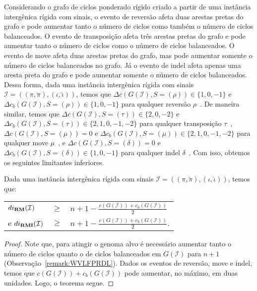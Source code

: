 Considerando o grafo de ciclos ponderado rígido criado a partir de uma instância intergênica rígida com sinais, o evento de reversão afeta duas arestas pretas do grafo e pode aumentar tanto o número de ciclos como também o número de ciclos balanceados. O evento de transposição afeta três arestas pretas do grafo e pode aumentar tanto o número de ciclos como o número de ciclos balanceados. O evento de move afeta duas arestas pretas do grafo, mas pode aumentar somente o número de ciclos balanceados no grafo. Já o evento de indel afeta apenas uma aresta preta do grafo e pode aumentar somente o número de ciclos balanceados. Dessa forma, dada uma instância intergênica rígida com sinais $\mathcal{I} = ((\pi,\breve\pi),(\iota,\breve\iota))$, temos que $\Delta c(G(\mathcal{I}), S=(\rho)) \in \{1,0,-1\}$ e $\Delta c_b(G(\mathcal{I}), S=(\rho)) \in \{1,0,-1\}$ para qualquer reversão $\rho$~\cite{1996-bafna-pevzner,2021b-oliveira-etal}. De maneira similar, temos que $\Delta c(G(\mathcal{I}), S=(\tau)) \in \{2,0,-2\}$ e $\Delta c_b(G(\mathcal{I}), S=(\tau)) \in \{2,1,0,{-1},{-2}\}$ para qualquer transposição $\tau$~\cite{1998-bafna-pevzner,2021a-oliveira-etal}, $\Delta c(G(\mathcal{I}), S=(\mu)) = 0$ e $\Delta c_b(G(\mathcal{I}), S=(\mu)) \in \{2,1,0,{-1},{-2}\}$ para qualquer move $\mu$~\cite{2021a-oliveira-etal}, e $\Delta c(G(\mathcal{I}), S=(\delta)) = 0$ e $\Delta c_b(G(\mathcal{I}), S=(\delta)) \in \{1,0,{-1}\}$ para qualquer indel $\delta$~\cite{2021b-oliveira-etal}. Com isso, obtemos os seguintes limitantes inferiores.

\begin{theorem}\label{theorem:OCNPWYNL}
Dada uma instância intergênica rígida com sinais $\mathcal{I} = ((\pi,\breve\pi),(\iota,\breve\iota))$, temos que:

\begin{tabular}{lll}
  $di_{\textbf{RM}}(\mathcal{I})$     & $ \ge $ & ${n + 1} - \frac{c(G(\mathcal{I})) + c_b(G(\mathcal{I}))}{2}$ \\
  e $di_{\textbf{RMI}}(\mathcal{I})$    & $ \ge $ & ${n + 1} - \frac{c(G(\mathcal{I})) + c_b(G(\mathcal{I}))}{2}$. \\
\end{tabular}
\end{theorem}
\begin{proof}
Note que, para atingir o genoma alvo é necessário aumentar tanto o número de ciclos quanto o de ciclos balanceados em $G(\mathcal{I})$ para $n+1$ (Observação~\ref{remark:WVLFPRDL}). Dados os eventos de reversão, move e indel, temos que $c(G(\mathcal{I})) + c_b(G(\mathcal{I}))$ pode aumentar, no máximo, em duas unidades. Logo, o teorema segue.
\end{proof}

